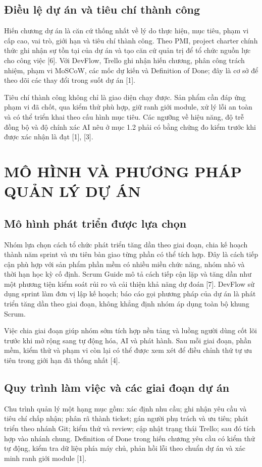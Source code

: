 \documentclass[12pt,a4paper]{report}
\begin{document}
\section{Điều lệ dự án và tiêu chí thành công}
Hiến chương dự án là căn cứ thống nhất về lý do thực hiện, mục tiêu, phạm vi cấp cao, vai trò, giới hạn và tiêu chí thành công. Theo PMI, project charter chính thức ghi nhận sự tồn tại của dự án và tạo căn cứ quản trị để tổ chức nguồn lực cho công việc [6]. Với DevFlow, Trello ghi nhận hiến chương, phân công trách nhiệm, phạm vi MoSCoW, các mốc dự kiến và Definition of Done; đây là cơ sở để theo dõi các thay đổi trong suốt dự án [1].

Tiêu chí thành công không chỉ là giao diện chạy được. Sản phẩm cần đáp ứng phạm vi đã chốt, qua kiểm thử phù hợp, giữ ranh giới module, xử lý lỗi an toàn và có thể triển khai theo cấu hình mục tiêu. Các ngưỡng về hiệu năng, độ trễ đồng bộ và độ chính xác AI nêu ở mục 1.2 phải có bằng chứng đo kiểm trước khi được xác nhận là đạt [1], [3].

\chapter{MÔ HÌNH VÀ PHƯƠNG PHÁP QUẢN LÝ DỰ ÁN}
\section{Mô hình phát triển được lựa chọn}
Nhóm lựa chọn cách tổ chức phát triển tăng dần theo giai đoạn, chia kế hoạch thành năm sprint và ưu tiên bàn giao từng phần có thể tích hợp. Đây là cách tiếp cận phù hợp với sản phẩm phần mềm có nhiều miền chức năng, nhóm nhỏ và thời hạn học kỳ cố định. Scrum Guide mô tả cách tiếp cận lặp và tăng dần như một phương tiện kiểm soát rủi ro và cải thiện khả năng dự đoán [7]. DevFlow sử dụng sprint làm đơn vị lập kế hoạch; báo cáo gọi phương pháp của dự án là phát triển tăng dần theo giai đoạn, không khẳng định nhóm áp dụng toàn bộ khung Scrum.

Việc chia giai đoạn giúp nhóm sớm tích hợp nền tảng và luồng người dùng cốt lõi trước khi mở rộng sang tự động hóa, AI và phát hành. Sau mỗi giai đoạn, phần mềm, kiểm thử và phạm vi còn lại có thể được xem xét để điều chỉnh thứ tự ưu tiên trong giới hạn đã thống nhất [4].

\section{Quy trình làm việc và các giai đoạn dự án}
Chu trình quản lý một hạng mục gồm: xác định nhu cầu; ghi nhận yêu cầu và tiêu chí chấp nhận; phân rã thành ticket; gán người phụ trách và ưu tiên; phát triển theo nhánh Git; kiểm thử và review; cập nhật trạng thái Trello; sau đó tích hợp vào nhánh chung. Definition of Done trong hiến chương yêu cầu có kiểm thử tự động, kiểm tra dữ liệu phía máy chủ, phản hồi lỗi theo chuẩn dự án và xác minh ranh giới module [1].
\end{document}
